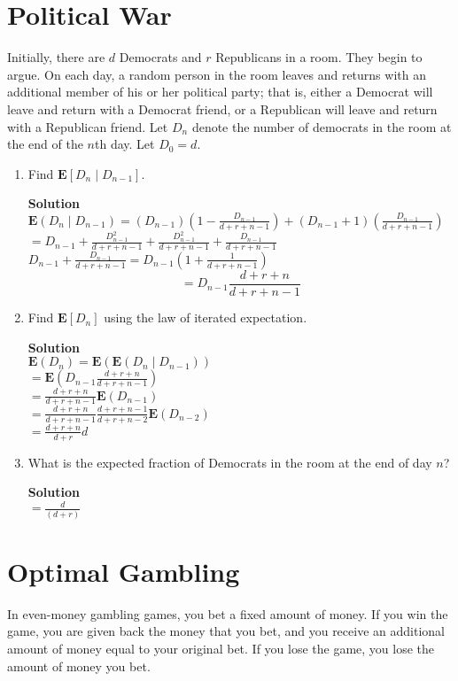 \documentclass[11pt]{article}
\newcommand*{\Question}[1]{\section{#1}}
\newenvironment{Parts}{\begin{enumerate}[label=(\alph*)]}{\end{enumerate}}
\newcommand*{\Part}{\item}
\newenvironment{Answer}{\vspace{10pt}\begin{mdframed}\textbf{Solution}\\}{\end{mdframed}\vfill\pagebreak[3]}
\newenvironment{Answer}{\vspace{10pt}}{\vfill\pagebreak[3]}
\newcommand*{\E}{\textbf{E}}
\begin{document}
\Question{Political War}

Initially, there are $d$ Democrats and $r$ Republicans in a room. They begin to argue. On each day, a random person in the room leaves and returns with an additional member of his or her political party; that is, either a Democrat will leave and return with a Democrat friend, or a Republican will leave and return with a Republican friend. Let $D_n$ denote the number of democrats in the room at the end of the $n$th day. Let $D_0 = d$.

\begin{Parts}
  \Part Find $\E[D_n \mid D_{n-1}]$.
  \begin{Answer}
$\E(D_n \mid D_{n-1})=(D_{n-1})(1-\frac{D_{n-1}}{d+r+n-1})+(D_{n-1}+1)(\frac{D_{n-1}}{d+r+n-1})$\\
$=D_{n-1}+\frac{D_{n-1}^2}{d+r+n-1}+\frac{D_{n-1}^2}{d+r+n-1}+\frac{D_{n-1}}{d+r+n-1}$\\
$D_{n-1}+\frac{D_{n-1}}{d+r+n-1}=D_{n-1}(1+\frac{1}{d+r+n-1})$\\
$$=D_{n-1}\frac{d+r+n}{d+r+n-1}$$
  \end{Answer}
  
  \Part Find $\E[D_n]$ using the law of iterated expectation.
  \begin{Answer}
$\E(D_n)=\E(\E(D_n \mid D_{n-1}))$\\
$=\E(D_{n-1}\frac{d+r+n}{d+r+n-1})$\\
$=\frac{d+r+n}{d+r+n-1}\E(D_{n-1})$\\
$=\frac{d+r+n}{d+r+n-1}\frac{d+r+n-1}{d+r+n-2}\E(D_{n-2})$\\
$=\frac{d+r+n}{d+r}d$
  \end{Answer}
  
  \Part What is the expected fraction of Democrats in the room at the end of day $n$?
  \begin{Answer}
$=\frac{d}{(d+r)}$
\end{Answer}
\end{Parts}


\Question{Optimal Gambling}

In even-money gambling games, you bet a fixed amount of money. If you win the game, you are given back the money that you bet, and you receive an additional amount of money equal to your original bet. If you lose the game, you lose the amount of money you bet.
\end{document}
